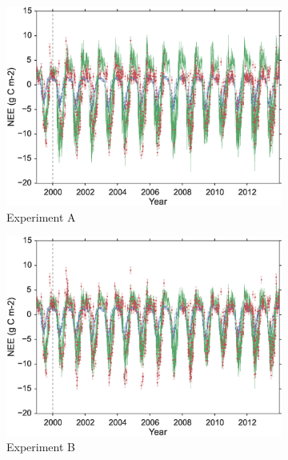 \documentclass[11pt]{article}
\begin{document}
\begin{figure}
    \centering
    \begin{subfigure}[b]{0.49\textwidth}
        \includegraphics[width=\textwidth]{A4dvar.eps}
        \caption{Experiment A}
        \label{fig:gull}
    \end{subfigure}
    \begin{subfigure}[b]{0.49\textwidth}
        \includegraphics[width=\textwidth]{B4dvar.eps}
        \caption{Experiment B}
        \label{fig:tiger}
    \end{subfigure}
    \begin{subfigure}[b]{0.49\textwidth}

\end{subfigure}
\end{figure}
\end{document}
